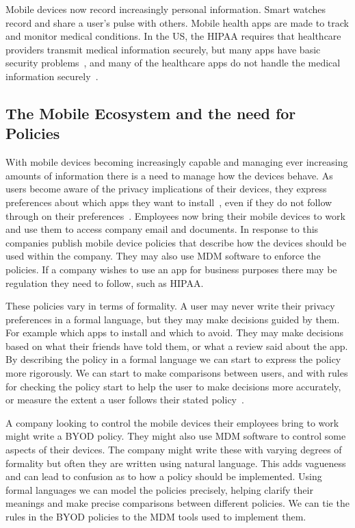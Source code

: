 \documentclass[thesis.tex]{subfiles}
\begin{document}
Mobile devices now record increasingly personal information.  Smart
watches record and share a user's pulse with others. Mobile health
apps are made to track and monitor medical conditions. In the US, the
\ac{HIPAA} requires that healthcare providers transmit medical
information securely, but many apps have basic security
problems~\cite{fahl_why_2012}, and many of the healthcare apps do not
handle the medical information securely~\cite{knorr_privacy_2015}.

\subsection{The Mobile Ecosystem and the need for Policies}

With mobile devices becoming increasingly capable and managing ever
increasing amounts of information there is a need to manage how the
devices behave.  As users become aware of the privacy implications of
their devices, they express preferences about which apps they want to
install~\cite{sadeh_understanding_2009}, even if they do not follow
through on their preferences~\cite{hallett_apppal_2016}.  Employees
now bring their mobile devices to work and use them to access company
email and documents.  In response to this companies publish mobile
device policies that describe how the devices should be used within
the company.  They may also use \ac{MDM} software to enforce the
policies.  If a company wishes to use an app for business purposes
there may be regulation they need to follow, such as \ac{HIPAA}.

These policies vary in terms of formality.  A user may never write
their privacy preferences in a formal language, but they may make
decisions guided by them.  For example which apps to install and which
to avoid.  They may make decisions based on what their friends have
told them, or what a review said about the app.  By describing the
policy in a formal language we can start to express the policy more
rigorously.  We can start to make comparisons between users, and with
rules for checking the policy start to help the user to make decisions
more accurately, or measure the extent a user follows their stated
policy~\cite{hallett_apppal_2016}.  

A company looking to control the mobile devices their employees bring
to work might write a \ac{BYOD} policy.  They might also use \ac{MDM}
software to control some aspects of their devices.  The company might
write these with varying degrees of formality but often they are
written using natural language.  This adds vagueness and can lead to
confusion as to how a policy should be implemented.  Using formal
languages we can model the policies precisely, helping clarify their
meanings and make precise comparisons between different policies.  We
can tie the rules in the \ac{BYOD} policies to the \ac{MDM} tools used
to implement them.
\end{document}
